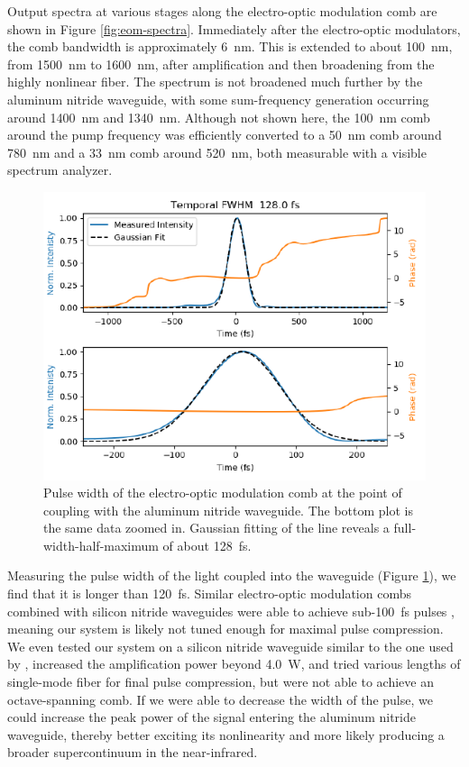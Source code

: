 Output spectra at various stages along the electro-optic modulation comb are shown in Figure \ref{fig:eom-spectra}. Immediately after the electro-optic modulators, the comb bandwidth is approximately 6~\si{\nano\meter}. This is extended to about 100~\si{\nano\meter}, from 1500~\si{\nano\meter} to 1600~\si{\nano\meter}, after amplification and then broadening from the highly nonlinear fiber. The spectrum is not broadened much further by the aluminum nitride waveguide, with some sum-frequency generation occurring around 1400~\si{\nano\meter} and 1340~\si{\nano\meter}. Although not shown here, the 100~\si{\nano\meter} comb around the pump frequency was efficiently converted to a 50~\si{\nano\meter} comb around 780~\si{\nano\meter} and a 33~\si{\nano\meter} comb around 520~\si{\nano\meter}, both measurable with a visible spectrum analyzer.

\begin{figure}
    \centering
    \includegraphics[width=\textwidth]{figures-3/eom-pulse.pdf}
    \caption[Electro-optic modulation comb pulse width]{Pulse width of the electro-optic modulation comb at the point of coupling with the aluminum nitride waveguide. The bottom plot is the same data zoomed in. Gaussian fitting of the line reveals a full-width-half-maximum of about 128~\si{\femto\second}.}
    \label{fig:eom-pulse}
\end{figure}

Measuring the pulse width of the light coupled into the waveguide (Figure \ref{fig:eom-pulse}), we find that it is longer than 120~\si{\femto\second}. Similar electro-optic modulation combs combined with silicon nitride waveguides were able to achieve sub-100~\si{\femto\second} pulses \citep{carlson_ultrafast_2017, obrzud_visible_2019}, meaning our system is likely not tuned enough for maximal pulse compression. We even tested our system on a silicon nitride waveguide similar to the one used by \citet{carlson_ultrafast_2017}, increased the amplification power beyond 4.0~\si{\watt}, and tried various lengths of single-mode fiber for final pulse compression, but were not able to achieve an octave-spanning comb. If we were able to decrease the width of the pulse, we could increase the peak power of the signal entering the aluminum nitride waveguide, thereby better exciting its nonlinearity and more likely producing a broader supercontinuum in the near-infrared.

